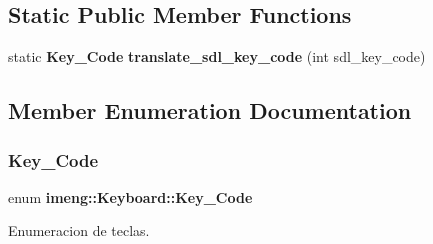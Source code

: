 \subsection*{Static Public Member Functions}
\begin{DoxyCompactItemize}
\item 
static \textbf{ Key\+\_\+\+Code} \textbf{ translate\+\_\+sdl\+\_\+key\+\_\+code} (int sdl\+\_\+key\+\_\+code)
\end{DoxyCompactItemize}


\subsection{Member Enumeration Documentation}
\mbox{\label{classimeng_1_1_keyboard_a53590b76e8c312fba655da8be0cf339a}} 
\subsubsection{Key\_Code}
{\footnotesize\ttfamily enum \textbf{ imeng\+::\+Keyboard\+::\+Key\+\_\+\+Code}}



Enumeracion de teclas. 

